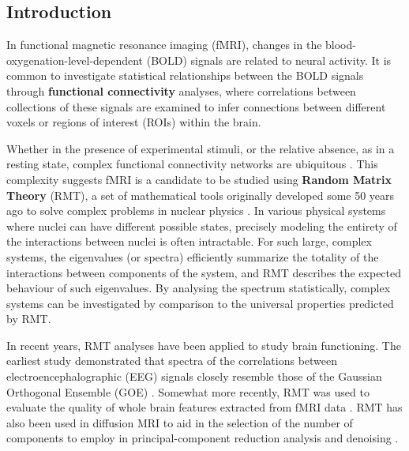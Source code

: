 \documentclass[12pt]{spieman}  %
\begin{document}
\begin{spacing}{2}   %

\section{Introduction}
\label{sect:intro}  %

In functional magnetic resonance imaging (fMRI), changes in the blood-oxygenation-level-dependent
(BOLD) signals are related to neural activity. It is common to investigate statistical relationships
between the BOLD signals through \textbf{functional connectivity} analyses, where correlations between
collections of these signals are examined to infer connections between different voxels or regions
of interest (ROIs) within the brain.

Whether in the presence of experimental stimuli, or the relative absence, as in a resting state,
complex functional connectivity networks are ubiquitous
.
This complexity suggests fMRI is a candidate to be studied using \textbf{Random Matrix Theory} (RMT), a set
of mathematical tools originally developed some 50 years ago to solve complex problems in nuclear
physics . In various
physical systems where nuclei can have different possible states, precisely modeling the entirety of
the interactions between nuclei is often intractable. For such large, complex systems, the
eigenvalues (or spectra) efficiently summarize the totality of the interactions between components
of the system, and RMT describes the expected behaviour of such eigenvalues. By analysing the
spectrum statistically, complex systems can be investigated by comparison to the universal
properties predicted by RMT.

In recent years, RMT analyses have been applied to study brain functioning.  The earliest  study
demonstrated that spectra of the correlations between electroencephalographic (EEG) signals closely
resemble those of the Gaussian Orthogonal Ensemble (GOE) .
Somewhat more recently, RMT was used to evaluate the quality of whole brain features extracted from
fMRI data . RMT has also
been used in diffusion MRI to aid in the selection of the number of components to employ in
principal-component reduction analysis and denoising
.


\end{spacing}
\end{document}
